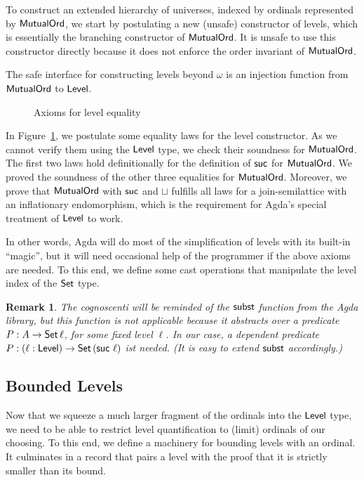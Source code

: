 \documentclass[manuscript,screen,review,anonymous]{acmart}
\newtheorem{remark}{Remark}
\begin{document}
{To construct an extended hierarchy of universes, indexed by ordinals
represented by $\AMutualOrd$, 
we start by postulating a new (unsafe) constructor of levels, which is
essentially the branching constructor of $\AMutualOrd$. It is unsafe
to use this constructor directly because it does not enforce the order invariant of $\AMutualOrd$.

\LCantor

The safe interface for constructing levels beyond $\omega$ is an
injection function from $\AMutualOrd$ to $\ALevel$.

\LtoLevel

\begin{figure}[tp]
  \LAxioms
  \caption{Axioms for level equality}
  \label{fig:axioms-level-equality}
\end{figure}
In Figure~\ref{fig:axioms-level-equality}, we postulate some equality
laws for the level constructor. As we cannot verify them using the
$\ALevel$ type, we check their soundness for $\AMutualOrd$.
The first two laws hold definitionally for the definition of $\Asuc$
for $\AMutualOrd$. We proved the soundness of the other three
equalities for $\AMutualOrd$.
Moreover, we prove that $\AMutualOrd$ with $\Asuc$ and $\sqcup$ fulfills all laws
for a join-semilattice with an inflationary endomorphism, which is the
requirement for Agda's special treatment of $\ALevel$ to work.

In other words, Agda will do most of the simplification of levels with
its built-in ``magic'', but it will need occasional help of the
programmer if the above axioms are needed. To this end, we define some
cast operations that manipulate the level index of the $\ASet$ type.

\Lcast

\begin{remark}
  The cognoscenti will be reminded of the $\Asubst$ function from the
  Agda library, but this function is not applicable because it
  abstracts over a predicate $P : A \to \ASeti\ell$, for some fixed
  level $\ell$. In our case, a \emph{dependent} predicate
  $P : (\ell : \ALevel) \to \ASeti{(\Asuc~\ell)}$ ist needed. (It is
  easy to extend $\Asubst$ accordingly.)
\end{remark}

\subsection{Bounded Levels}
\label{sec:bounded-levels}

Now that we squeeze a much larger fragment of the ordinals into the
$\ALevel$ type, we need to be able to restrict level quantification to
(limit) ordinals of our choosing. To this end, we define a machinery
for bounding levels with an ordinal. It culminates in a record that
pairs a level with the proof that it is strictly smaller than its bound.

}
\end{document}

